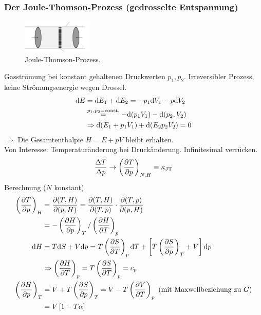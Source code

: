 \subsubsection{Der Joule-Thomson-Prozess (gedrosselte Entspannung)}
\begin{figure}[H]
    \begin{center}
        \includegraphics[width=0.3\textwidth]{../img/joule-thomson-process.pdf}
        \caption{Joule-Thomson-Prozess.}
        \label{img:joule-thomson-process}
    \end{center}
\end{figure}
Gasströmung bei konstant gehaltenen Druckwerten $p_1, p_2$. Irreversibler Prozess, keine Strömungsenergie wegen Drossel.
\begin{equation}
    \begin{split}
        \mathrm{d} E &= \mathrm{d} E_1 + \mathrm{d} E_2 = - p_1 \mathrm{d} V_1 - p \mathrm{d} V_2 \\
        & \overset{p_1, p_2 = \text{const.}}{=} - \mathrm{d} (p_1 V_1) - \mathrm{d} (p_2, V_2) \\
        & \Rightarrow \mathrm{d} (E_1 + p_1 V_1) + \mathrm{d} (E_2 p_2 V_2) = 0
    \end{split}
\end{equation}
$\Rightarrow$ Die Gesamtenthalpie $H = E + p V$ bleibt erhalten.\\
Von Interesse: Temperaturänderung bei Druckänderung. Infinitesimal verrücken.
\begin{equation}
    \frac{\Delta T}{\Delta p} \to \left( \frac{\partial T}{\partial p} \right)_{N, H} \equiv \kappa_\text{JT}
\end{equation}
Berechnung ($N$ konstant)
\begin{equation}
    \begin{split}
        \left( \frac{\partial T}{\partial p} \right)_{H} &= \frac{\partial (T, H)}{\partial (p, H)} = \frac{\partial (T, H)}{\partial (T, p)} \cdot \frac{\partial (T, p)}{\partial (p, H)} \\
        &= - \left( \frac{\partial H}{\partial p} \right)_{T} / \left( \frac{\partial H}{\partial T} \right)_{p} \\
        \mathrm{d} H &= T \mathrm{d} S + V \mathrm{d} p = T \left( \frac{\partial S}{\partial T} \right)_{p} \mathrm{d} T + \left[ T \left( \frac{\partial S}{\partial p} \right)_{T} + V \right] \mathrm{d} p \\
        & \Rightarrow \left( \frac{\partial H}{\partial T} \right)_{p} = T \left( \frac{\partial S}{\partial T} \right)_{p} = c_p \\
        \left( \frac{\partial H}{\partial p} \right)_{T} &= V + T \left( \frac{\partial S}{\partial p} \right)_{T} = V - T \left( \frac{\partial V}{\partial T} \right)_{p} \text{ (mit Maxwellbeziehung zu $G$)} \\
        &= V \left[ 1 - T \alpha \right]
    \end{split}
\end{equation}
